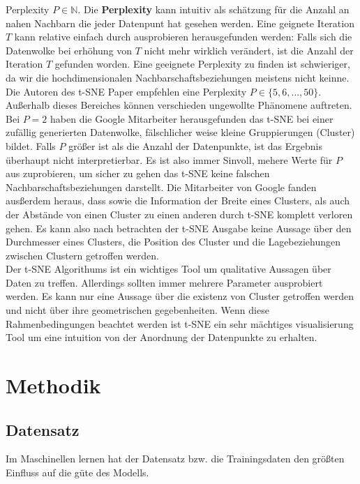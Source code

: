 \documentclass[12pt,letterpaper,ngerman]{article}
\begin{document}
Perplexity $P \in \mathbb{N}$. Die {\bf Perplexity} kann intuitiv als schätzung 
für die Anzahl an nahen Nachbarn die jeder Datenpunt hat gesehen werden.
Eine geignete Iteration $T$ kann relative einfach durch ausprobieren 
herausgefunden werden: Falls sich die Datenwolke bei erhöhung von $T$
nicht mehr wirklich verändert, ist die Anzahl der Iteration $T$ gefunden
worden. Eine geeignete Perplexity zu finden ist schwieriger, da wir die
hochdimensionalen Nachbarschaftsbeziehungen meistens nicht keinne. Die Autoren
des t-SNE Paper empfehlen eine Perplexity $P \in \{5,6, \dots, 50\}$. Außerhalb
dieses Bereiches können verschieden ungewollte Phänomene auftreten. Bei $P=2$
haben die Google Mitarbeiter herausgefunden das t-SNE bei einer zufällig generierten
Datenwolke, fälschlicher weise kleine Gruppierungen (Cluster) bildet. Falls
$P$ größer ist als die Anzahl der Datenpunkte, ist das Ergebnis überhaupt nicht
interpretierbar. Es ist also immer Sinvoll, mehere Werte für $P$ aus zuprobieren,
um sicher zu gehen das t-SNE keine falschen Nachbarschaftsbeziehungen darstellt.
Die Mitarbeiter von Google fanden ausßerdem heraus, dass sowie die Information 
der Breite eines Clusters, als auch der Abstände von einen Cluster zu einen anderen 
durch t-SNE komplett verloren gehen. Es kann also nach betrachten der
t-SNE Ausgabe keine Aussage über den Durchmesser eines Clusters, die Position
des Cluster und die Lagebeziehungen zwischen Clustern getroffen werden. \\
Der t-SNE Algorithums ist ein wichtiges Tool um qualitative Aussagen über 
Daten zu treffen. Allerdings sollten immer mehrere Parameter ausprobiert werden.
Es kann nur eine Aussage über die existenz von Cluster getroffen werden und 
nicht über ihre geometrischen gegebenheiten. Wenn diese Rahmenbedingungen 
beachtet werden ist t-SNE ein sehr mächtiges visualisierung Tool um eine 
intuition von der Anordnung der Datenpunkte zu erhalten.


\section{Methodik}
\subsection{Datensatz}
Im Maschinellen lernen hat der Datensatz bzw. die Trainingsdaten den
größten Einfluss auf die güte des Modells.
\end{document}
